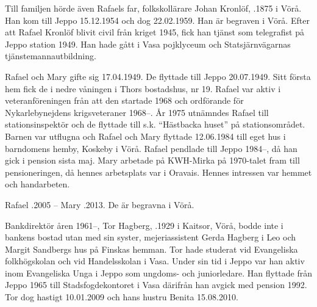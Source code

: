 Till familjen hörde även Rafaels far, folkskollärare Johan Kronlöf, .1875 i Vörå. Han kom till Jeppo 		15.12.1954 och dog 22.02.1959. Han är begraven i Vörå. Efter att Rafael Kronlöf blivit civil från kriget 1945, fick han	tjänst som telegrafist på Jeppo station 1949. Han hade gått i	Vasa pojklyceum och Statsjärnvägarnas 			tjänstemannautbildning.

Rafael och Mary gifte sig 17.04.1949. De flyttade till Jeppo 20.07.1949. Sitt första hem fick de i nedre våningen i Thors bostadshus, nr 19.  Rafael var aktiv i veteranföreningen från att den startade 1968 och ordförande för Nykarlebynejdens krigsveteraner 1968--. År 1975 utnämndes Rafael till stationsinspektör och de flyttade till s.k. ``Hästbacka huset'' på stationsområdet. Barnen var utflugna och Rafael och Mary flyttade 12.06.1984	till eget hus i barndomens hemby, Koskeby i Vörå.	Rafael pendlade till Jeppo 1984--, då han gick i pension sista maj. Mary arbetade på KWH-Mirka på 1970-talet fram till pensioneringen, då hennes arbetsplats var i Oravais.  Hennes intressen var hemmet och handarbeten.

Rafael .2005  --  Mary .2013. De är begravna i Vörå.


Bankdirektör åren 1961--, Tor Hagberg, .1929 i Kaitsor, Vörå, bodde inte i bankens bostad utan med sin syster, mejeriassistent Gerda Hagberg i Leo och Margit Sandbergs hus på Finskas hemman. Tor hade studerat vid Evangeliska folkhögskolan och vid Handelsskolan i Vasa. Under sin tid i Jeppo var han aktiv inom Evangeliska Unga i	Jeppo som ungdoms- och juniorledare. Han flyttade från Jeppo 1965 till Stadsfogdekontoret i Vasa därifrån han avgick med pension 1992. Tor dog hastigt 10.01.2009 och hans hustru Benita 15.08.2010.


